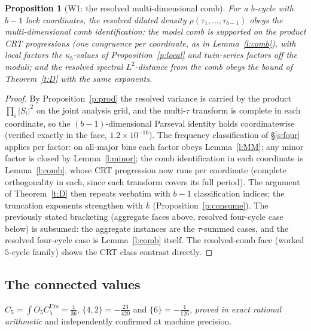\documentclass[11pt]{article}
\numberwithin{equation}{section}
\newtheorem{proposition}[theorem]{Proposition}
\theoremstyle{definition}
\theoremstyle{remark}
\begin{document}
\begin{proposition}[W1: the resolved multi-dimensional
comb]\label{p:W1}
For a $b$-cycle with $b-1$ lock coordinates, the resolved dilated
density
$\rho(\tau_1,\dots,\tau_{b-1})$ obeys the multi-dimensional comb
identification: the model comb is supported on the product CRT
progressions (one congruence per coordinate, as in
Lemma~\ref{l:comb}), with local factors the $\kappa_b$-values of
Proposition~\ref{p:local} and twin-series factors off the moduli;
and the resolved spectral $L^2$-distance from the comb obeys the
bound of Theorem~\ref{t:D} with the same exponents.
\end{proposition}

\begin{proof}
By Proposition~\ref{p:prod} the resolved variance is carried by
the product $\prod_i|S_i|^2$ on the joint analysis grid, and the
multi-$\tau$ transform is complete in each coordinate, so the
$(b-1)$-dimensional Parseval identity holds coordinatewise
(verified exactly in the face, $1.2\times10^{-16}$). The
frequency classification of \S\ref{s:four} applies per factor:
on all-major bins each factor obeys Lemma~\ref{l:MM}; any minor
factor is closed by Lemma~\ref{l:minor}; the comb identification
in each coordinate is Lemma~\ref{l:comb}, whose CRT progression
now runs per coordinate (complete orthogonality in each, since
each transform covers its full period). The argument of
Theorem~\ref{t:D} then repeats verbatim with $b-1$ classification
indices; the truncation exponents strengthen with $k$
(Proposition~\ref{p:consume}). The previously stated bracketing
(aggregate faces above, resolved four-cycle case below) is
subsumed: the aggregate instances are the $\tau$-summed cases,
and the resolved four-cycle case is Lemma~\ref{l:comb} itself.
The resolved-comb face (worked $5$-cycle family) shows the CRT
class contrast directly.
\end{proof}

\subsection{The connected values}\label{s:five:conn}

$C_5=\int O_5C_5^{\mathrm{Urs}}=\tfrac1{36}$,
$\{4,2\}=-\tfrac{23}{420}$ and $\{6\}=-\tfrac1{126}$,
\emph{proved in exact rational arithmetic} and independently
confirmed at machine precision.
\end{document}
